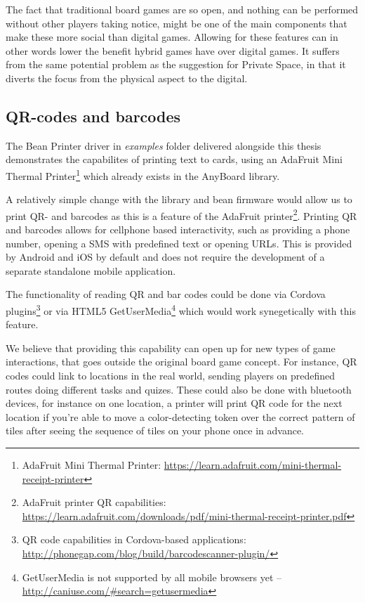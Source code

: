 The fact that traditional board games are so open, and nothing can be performed without other players taking notice, might be one of the main components that make these more social than digital games. Allowing for these features can in other words lower the benefit hybrid games have over digital games. It suffers from the same potential problem as the suggestion for Private Space, in that it diverts the focus from the physical aspect to the digital.

\subsection{QR-codes and barcodes}
The Bean Printer driver in \emph{examples} folder delivered alongside this thesis demonstrates the capabilites of printing text to cards, using an AdaFruit Mini Thermal Printer\footnote{AdaFruit Mini Thermal Printer: \href{https://learn.adafruit.com/mini-thermal-receipt-printer}{https://learn.adafruit.com/mini-thermal-receipt-printer}} which already exists in the AnyBoard library.

A relatively simple change with the library and bean firmware would allow us to print QR- and barcodes as this is a feature of the AdaFruit printer\footnote{AdaFruit printer QR capabilities: \href{https://learn.adafruit.com/downloads/pdf/mini-thermal-receipt-printer.pdf}{https://learn.adafruit.com/downloads/pdf/mini-thermal-receipt-printer.pdf}}. Printing QR and barcodes allows for cellphone based interactivity, such as providing a phone number, opening a SMS with predefined text or opening URLs. This is provided by Android and iOS by default and does not require the development of a separate standalone mobile application.

The functionality of reading QR and bar codes could be done via Cordova plugins\footnote{QR code capabilities in Cordova-based applications: \href{http://phonegap.com/blog/build/barcodescanner-plugin/}{http://phonegap.com/blog/build/barcodescanner-plugin/}} or via HTML5 GetUserMedia\footnote{GetUserMedia is not supported by all mobile browsers yet – \href{http://caniuse.com/\#search=getusermedia}{http://caniuse.com/\#search=getusermedia}} which would work synegetically with this feature.

We believe that providing this capability can open up for new types of game interactions, that goes outside the original board game concept. For instance, QR codes could link to locations in the real world, sending players on predefined routes doing different tasks and quizes. These could also be done with bluetooth devices, for instance on one location, a printer will print QR code for the next location if you're able to move a color-detecting token over the correct pattern of tiles after seeing the sequence of tiles on your phone once in advance.

